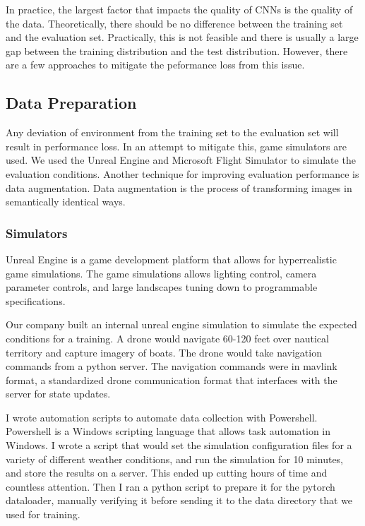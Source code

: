 \documentclass[12pt]{article}
\begin{document}
In practice, the largest factor that impacts the quality of CNNs is the quality of the data. Theoretically, there should be no difference between the training set and the evaluation set. Practically, this is not feasible and there is usually a large gap between the training distribution and the test distribution. However, there are a few approaches to mitigate the peformance loss from this issue.

\subsection{Data Preparation}
Any deviation of environment from the training set to the evaluation set will result in performance loss. In an attempt to mitigate this, game simulators are used. We used the Unreal Engine and Microsoft Flight Simulator to simulate the evaluation conditions. Another technique for improving evaluation performance is data augmentation. Data augmentation is the process of transforming images in semantically identical ways. 
  
\subsubsection{Simulators}
Unreal Engine is a game development platform that allows for hyperrealistic game simulations. The game simulations allows lighting control, camera parameter controls, and large landscapes tuning down to programmable specifications.

Our company built an internal unreal engine simulation to simulate the expected conditions for a training. A drone would navigate 60-120 feet over nautical territory and capture imagery of boats. The drone would take navigation commands from a python server. The navigation commands were in mavlink format, a standardized drone communication format that interfaces with the server for state updates. \cite{UsingPymavlinkLibraries}

I wrote automation scripts to automate data collection with Powershell. Powershell is a Windows scripting language that allows task automation in Windows. I wrote a script that would set the simulation configuration files for a variety of different weather conditions, and run the simulation for 10 minutes, and store the results on a server. This ended up cutting hours of time and countless attention. Then I ran a python script to prepare it for the pytorch dataloader, manually verifying it before sending it to the data directory that we used for training.
\end{document}
